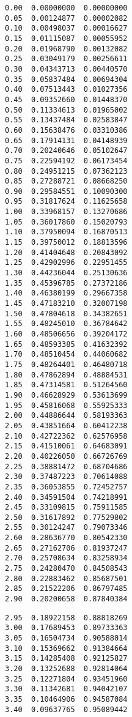 \documentclass[10pt,reqno]{amsart}
\theoremstyle{plain}
\theoremstyle{definition}
\theoremstyle{remark}
\begin{document}
\begin{table}[tbp]
\caption{\small Values of the probability density and distribution function for the spacing $s$ between the two largest eigenvalues; with $s=0(0.05)8.95$.}\label{table:numbers}
{\scriptsize
\begin{minipage}{0.3\textwidth}
\begin{verbatim}
0.00  0.00000000  0.00000000
0.05  0.00124877  0.00002082
0.10  0.00498037  0.00016627
0.15  0.01115087  0.00055952
0.20  0.01968790  0.00132082
0.25  0.03049179  0.00256611
0.30  0.04343713  0.00440570
0.35  0.05837484  0.00694304
0.40  0.07513443  0.01027356
0.45  0.09352660  0.01448370
0.50  0.11334613  0.01965002
0.55  0.13437484  0.02583847
0.60  0.15638476  0.03310386
0.65  0.17914131  0.04148939
0.70  0.20240646  0.05102647
0.75  0.22594192  0.06173454
0.80  0.24951215  0.07362123
0.85  0.27288721  0.08668250
0.90  0.29584551  0.10090300
0.95  0.31817624  0.11625658
1.00  0.33968157  0.13270686
1.05  0.36017860  0.15020793
1.10  0.37950094  0.16870513
1.15  0.39750012  0.18813596
1.20  0.41404648  0.20843092
1.25  0.42902996  0.22951455
1.30  0.44236044  0.25130636
1.35  0.45396785  0.27372186
1.40  0.46380199  0.29667358
1.45  0.47183210  0.32007198
1.50  0.47804618  0.34382651
1.55  0.48245010  0.36784642
1.60  0.48506656  0.39204172
1.65  0.48593385  0.41632392
1.70  0.48510454  0.44060682
1.75  0.48264401  0.46480718
1.80  0.47862894  0.48884531
1.85  0.47314581  0.51264560
1.90  0.46628929  0.53613699
1.95  0.45816068  0.55925333
2.00  0.44886644  0.58193363
2.05  0.43851664  0.60412238
2.10  0.42722362  0.62576958
2.15  0.41510061  0.64683091
2.20  0.40226050  0.66726769
2.25  0.38881472  0.68704686
2.30  0.37487223  0.70614088
2.35  0.36053855  0.72452757
2.40  0.34591504  0.74218991
2.45  0.33109815  0.75911585
2.50  0.31617892  0.77529802
2.55  0.30124247  0.79073346
2.60  0.28636770  0.80542330
2.65  0.27162706  0.81937247
2.70  0.25708634  0.83258934
2.75  0.24280470  0.84508543
2.80  0.22883462  0.85687501
2.85  0.21522206  0.86797485
2.90  0.20200658  0.87840384
\end{verbatim}
\end{minipage}
\hfil
\begin{minipage}{0.3\textwidth}
\begin{verbatim}
2.95  0.18922158  0.88818269
3.00  0.17689453  0.89733363
3.05  0.16504734  0.90588014
3.10  0.15369662  0.91384664
3.15  0.14285408  0.92125827
3.20  0.13252688  0.92814064
3.25  0.12271804  0.93451960
3.30  0.11342681  0.94042107
3.35  0.10464906  0.94587084
3.40  0.09637765  0.95089442

\end{verbatim}
\end{minipage}}
\end{table}
\end{document}
